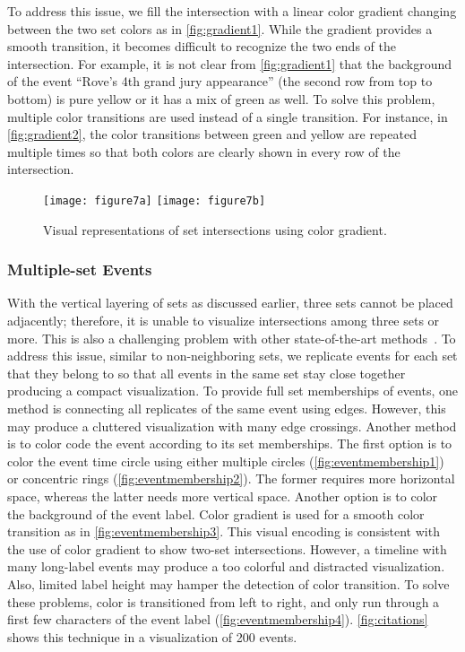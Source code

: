 To address this issue, we fill the intersection with a linear color gradient changing between the two set colors as in \autoref{fig:gradient1}. While the gradient provides a smooth transition, it becomes difficult to recognize the two ends of the intersection. For example, it is not clear from \autoref{fig:gradient1} that the background of the event ``Rove's 4th grand jury appearance'' (the second row from top to bottom) is pure yellow or it has a mix of green as well. To solve this problem, multiple color transitions are used instead of a single transition. For instance, in \autoref{fig:gradient2}, the color transitions between green and yellow are repeated multiple times so that both colors are clearly shown in every row of the intersection.

\begin{figure}[!htb]
	\centering
		{\texttt{[image: figure7a]}}
	\hfill
		{\texttt{[image: figure7b]}}
	\caption{Visual representations of set intersections using color gradient.}
	\label{fig:gradient}
\end{figure}

\subsubsection{Multiple-set Events}
With the vertical layering of sets as discussed earlier, three sets cannot be placed adjacently; therefore, it is unable to visualize intersections among three sets or more. This is also a challenging problem with other state-of-the-art methods~\cite{Alsallakh2014}. To address this issue, similar to non-neighboring sets, we replicate events for each set that they belong to so that all events in the same set stay close together producing a compact visualization. To provide full set memberships of events, one method is connecting all replicates of the same event using edges. However, this may produce a cluttered visualization with many edge crossings. Another method is to color code the event according to its set memberships. The first option is to color the event time circle using either multiple circles (\autoref{fig:eventmembership1}) or concentric rings (\autoref{fig:eventmembership2}). The former requires more horizontal space, whereas the latter needs more vertical space. Another option is to color the background of the event label. Color gradient is used for a smooth color transition as in \autoref{fig:eventmembership3}. This visual encoding is consistent with the use of color gradient to show two-set intersections. However, a timeline with many long-label events may produce a too colorful and distracted visualization. Also, limited label height may hamper the detection of color transition. To solve these problems, color is transitioned from left to right, and only run through a first few characters of the event label (\autoref{fig:eventmembership4}). \autoref{fig:citations} shows this technique in a visualization of 200 events.

